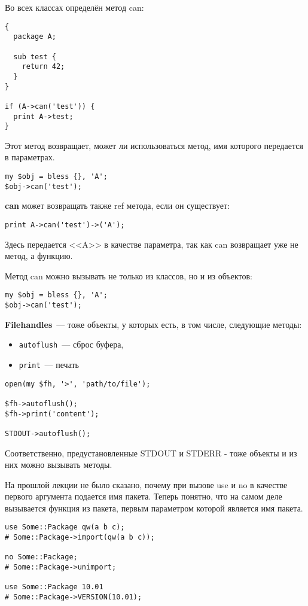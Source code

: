 Во всех классах определён метод can:
\begin{verbatim}
{
  package A;

  sub test {
    return 42;
  }
}

if (A->can('test')) {
  print A->test;
}
\end{verbatim}
Этот метод возвращает, может ли использоваться метод, имя которого передается в параметрах.
\begin{verbatim}
my $obj = bless {}, 'A';
$obj->can('test');
\end{verbatim}
\textbf{can} может возвращать также ref метода, если он существует:
\begin{verbatim}
print A->can('test')->('A');
\end{verbatim}
Здесь передается <<A>> в качестве параметра, так как can возвращает уже не метод, а функцию.

Метод can можно вызывать не только из классов, но и из объектов:
\begin{verbatim}
my $obj = bless {}, 'A';
$obj->can('test');
\end{verbatim}

\textbf{Filehandles}~--- тоже объекты, у которых есть, в том числе, следующие методы:
\begin{itemize}
  \item \verb|autoflush|~--- сброс буфера,
  \item \verb|print|~--- печать
\end{itemize}

\begin{verbatim}
open(my $fh, '>', 'path/to/file');

$fh->autoflush();
$fh->print('content');

STDOUT->autoflush();
\end{verbatim}
Соответственно, предустановленные STDOUT и STDERR - тоже объекты и из них можно вызывать методы.

На прошлой лекции не было сказано, почему при вызове use и no в качестве первого аргумента подается имя пакета. Теперь понятно, что на самом деле вызывается функция из пакета, первым параметром которой является имя пакета.
\begin{verbatim}
use Some::Package qw(a b c);
# Some::Package->import(qw(a b c));

no Some::Package;
# Some::Package->unimport;

use Some::Package 10.01
# Some::Package->VERSION(10.01);
\end{verbatim}

